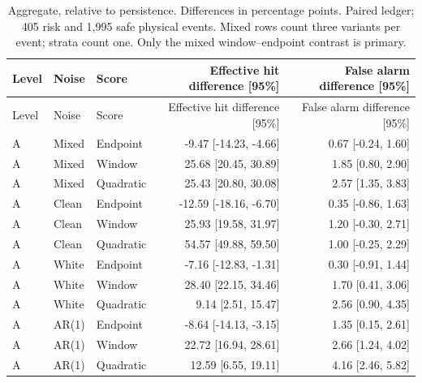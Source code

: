 \documentclass[10pt]{article}
\begin{document}
\begingroup\small\setlength{\tabcolsep}{3.8pt}
\begin{longtable}{lllrr}
\caption{Aggregate, relative to persistence. Differences in percentage points. Paired ledger; 405 risk and 1,995 safe physical events. Mixed rows count three variants per event; strata count one. Only the mixed window--endpoint contrast is primary.}\\
\toprule Level & Noise & Score & Effective hit difference [95\%] & False alarm difference [95\%] \\\midrule\endfirsthead
\toprule Level & Noise & Score & Effective hit difference [95\%] & False alarm difference [95\%] \\\midrule\endhead
A & Mixed & Endpoint & -9.47 [-14.23, -4.66] & 0.67 [-0.24, 1.60] \\
A & Mixed & Window & 25.68 [20.45, 30.89] & 1.85 [0.80, 2.90] \\
A & Mixed & Quadratic & 25.43 [20.80, 30.08] & 2.57 [1.35, 3.83] \\
A & Clean & Endpoint & -12.59 [-18.16, -6.70] & 0.35 [-0.86, 1.63] \\
A & Clean & Window & 25.93 [19.58, 31.97] & 1.20 [-0.30, 2.71] \\
A & Clean & Quadratic & 54.57 [49.88, 59.50] & 1.00 [-0.25, 2.29] \\
A & White & Endpoint & -7.16 [-12.83, -1.31] & 0.30 [-0.91, 1.44] \\
A & White & Window & 28.40 [22.15, 34.46] & 1.70 [0.41, 3.06] \\
A & White & Quadratic & 9.14 [2.51, 15.47] & 2.56 [0.90, 4.35] \\
A & AR(1) & Endpoint & -8.64 [-14.13, -3.15] & 1.35 [0.15, 2.61] \\
A & AR(1) & Window & 22.72 [16.94, 28.61] & 2.66 [1.24, 4.02] \\
A & AR(1) & Quadratic & 12.59 [6.55, 19.11] & 4.16 [2.46, 5.82] \\
\bottomrule\end{longtable}\endgroup
\begingroup\small\setlength{\tabcolsep}{3.8pt}
\end{document}
